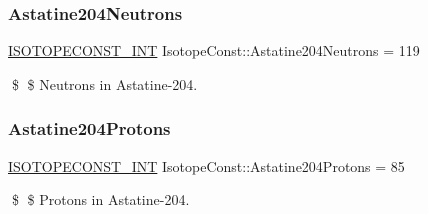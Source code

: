 \subsubsection{\texorpdfstring{Astatine204\+Neutrons}{Astatine204Neutrons}}
{\footnotesize\ttfamily \mbox{\hyperlink{group___isotope_const-_macros_ga5f18360b3e99483a35c32d789e62621c}{I\+S\+O\+T\+O\+P\+E\+C\+O\+N\+S\+T\+\_\+\+I\+NT}} Isotope\+Const\+::\+Astatine204\+Neutrons = 119}

\$ \$ Neutrons in Astatine-\/204. \mbox{\label{group___isotope_const-_astatine-_at204_gaf269710c9aa12e3ee6357dcf76ac7651}} 
\subsubsection{\texorpdfstring{Astatine204\+Protons}{Astatine204Protons}}
{\footnotesize\ttfamily \mbox{\hyperlink{group___isotope_const-_macros_ga5f18360b3e99483a35c32d789e62621c}{I\+S\+O\+T\+O\+P\+E\+C\+O\+N\+S\+T\+\_\+\+I\+NT}} Isotope\+Const\+::\+Astatine204\+Protons = 85}

\$ \$ Protons in Astatine-\/204. 